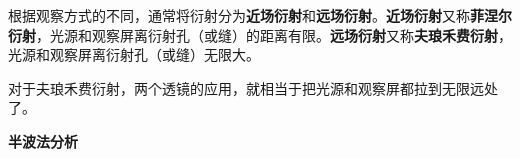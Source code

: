 
\begin{issues}
\issueDraft
\end{issues}

根据观察方式的不同，通常将衍射分为\textbf{近场衍射}和\textbf{远场衍射}。\textbf{近场衍射}又称\textbf{菲涅尔衍射}，光源和观察屏离衍射孔（或缝）的距离有限。\textbf{远场衍射}又称\textbf{夫琅禾费衍射}，光源和观察屏离衍射孔（或缝）无限大。

对于夫琅禾费衍射，两个透镜的应用，就相当于把光源和观察屏都拉到无限远处了。

\textbf{半波法分析}
